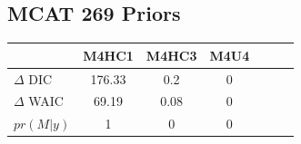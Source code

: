 \documentclass[12pt]{article}
\begin{document}
%
%	
%
%

\clearpage
\subsection{MCAT 269 Priors}
	\begin{table}[ht!]
        \centering
        \begin{tabular}[c]{@{}lcccccc@{}}
        \hline
        & M4HC1 & M4HC3 & M4U4 \\ \hline
	\(\Delta\) DIC & 176.33 & 0.2 & 0 \\                                              
	\(\Delta\) WAIC & 69.19 & 0.08 & 0 \\                                             
	\(pr(M|y)\) & 1 & 0 & 0
        \end{tabular}
        \end{table}
\end{document}
